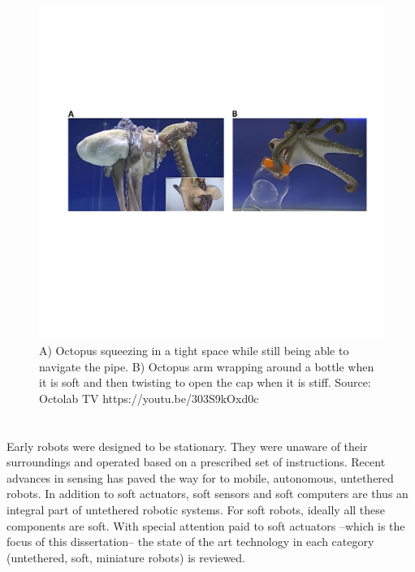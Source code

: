 \begin{figure}[!ht]
      \centering
      \includegraphics[width=\textwidth]{octopusBottle.pdf}
      \caption[] {A) Octopus squeezing in a tight space while still being able to navigate the pipe. B) Octopus arm wrapping around a bottle when it is soft and then twisting to open the cap when it is stiff. Source: Octolab TV https://youtu.be/303S9kOxd0c	}
      \label{fig:octopusBottle}
\end{figure}

\section{}
Early robots were designed to be stationary. They were unaware of their surroundings and operated based on a prescribed set of instructions. Recent advances in sensing has paved the way for to mobile, autonomous, untethered robots. In addition to soft actuators, soft sensors and soft computers are thus an integral part of untethered robotic systems. For soft robots, ideally all these components are soft. With special attention paid to soft actuators --which is the focus of this dissertation-- the state of the art technology in each category (untethered, soft, miniature robots) is reviewed. 

